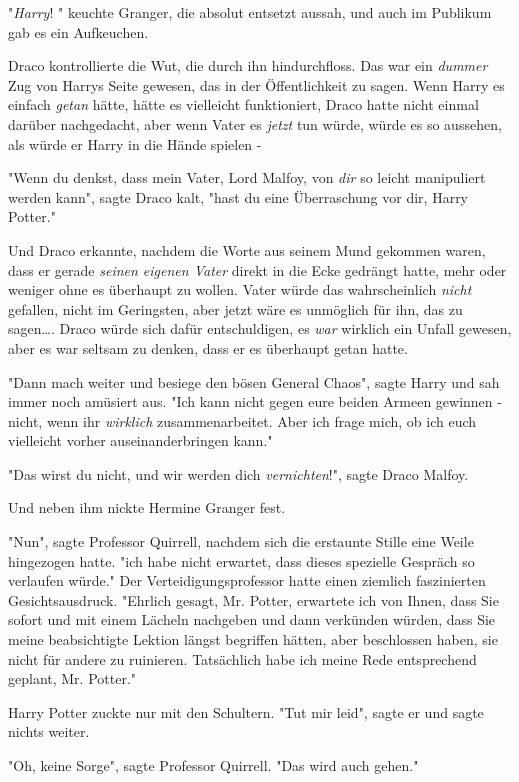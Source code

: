 {"\emph{Harry}! " keuchte Granger, die absolut entsetzt aussah, und auch im Publikum gab es ein Aufkeuchen.

Draco kontrollierte die Wut, die durch ihn hindurchfloss. Das war ein \emph{dummer} Zug von Harrys Seite gewesen, das in der Öffentlichkeit zu sagen. Wenn Harry es einfach \emph{getan} hätte, hätte es vielleicht funktioniert, Draco hatte nicht einmal darüber nachgedacht, aber wenn Vater es \emph{jetzt} tun würde, würde es so aussehen, als würde er Harry in die Hände spielen -

"Wenn du denkst, dass mein Vater, Lord Malfoy, von \emph{dir} so leicht manipuliert werden kann", sagte Draco kalt, "hast du eine Überraschung vor dir, Harry Potter."

Und Draco erkannte, nachdem die Worte aus seinem Mund gekommen waren, dass er gerade \emph{seinen eigenen Vater} direkt in die Ecke gedrängt hatte, mehr oder weniger ohne es überhaupt zu wollen. Vater würde das wahrscheinlich \emph{nicht} gefallen, nicht im Geringsten, aber jetzt wäre es unmöglich für ihn, das zu sagen…. Draco würde sich dafür entschuldigen, es \emph{war} wirklich ein Unfall gewesen, aber es war seltsam zu denken, dass er es überhaupt getan hatte.

"Dann mach weiter und besiege den bösen General Chaos", sagte Harry und sah immer noch amüsiert aus. "Ich kann nicht gegen eure beiden Armeen gewinnen - nicht, wenn ihr \emph{wirklich} zusammenarbeitet. Aber ich frage mich, ob ich euch vielleicht vorher auseinanderbringen kann."

"Das wirst du nicht, und wir werden dich \emph{vernichten}!", sagte Draco Malfoy.

Und neben ihm nickte Hermine Granger fest.

"Nun", sagte Professor Quirrell, nachdem sich die erstaunte Stille eine Weile hingezogen hatte. "ich habe nicht erwartet, dass dieses spezielle Gespräch so verlaufen würde." Der Verteidigungsprofessor hatte einen ziemlich faszinierten Gesichtsausdruck. "Ehrlich gesagt, Mr. Potter, erwartete ich von Ihnen, dass Sie sofort und mit einem Lächeln nachgeben und dann verkünden würden, dass Sie meine beabsichtigte Lektion längst begriffen hätten, aber beschlossen haben, sie nicht für andere zu ruinieren. Tatsächlich habe ich meine Rede entsprechend geplant, Mr. Potter."

Harry Potter zuckte nur mit den Schultern. "Tut mir leid", sagte er und sagte nichts weiter.

"Oh, keine Sorge", sagte Professor Quirrell. "Das wird auch gehen."

}
